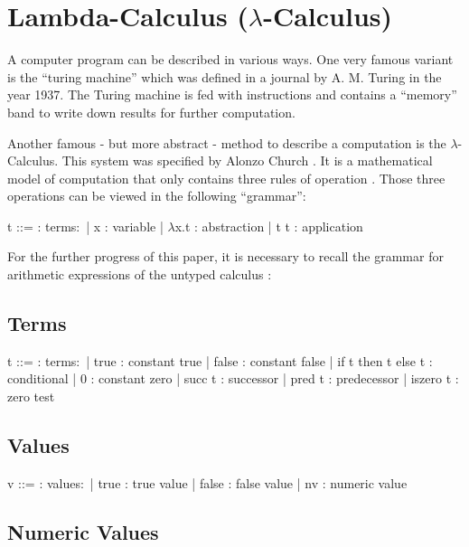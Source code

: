 \section{Lambda-Calculus ($\lambda$-Calculus)}
\label{sec:calculus}

A computer program can be described in various
ways. One very famous variant is the ``turing machine''
which was defined in a journal \cite{aturingMachine} by
A. M. Turing in the year 1937. The Turing machine
is fed with instructions and contains a ``memory'' band
to write down results for further computation.

Another famous - but more abstract - method to describe
a computation is the $\lambda$-Calculus. This system was
specified by Alonzo Church \cite{churchLambda}. It is a mathematical
model of computation that only contains three rules
of operation \cite{pierce2002ProgLang}.
Those three operations can be viewed in the following ``grammar'':

\begin{bnfgrammar}
    t ::= : terms$\colon$
    | x : variable
    | $\lambda$x.t : abstraction
    | t t : application
\end{bnfgrammar}

For the further progress of this paper, it is necessary to recall
the grammar for arithmetic expressions of the untyped calculus \cite{pierce2002ProgLang}:

\subsection{Terms}

\begin{bnfgrammar}
    t ::= : terms$\colon$
    | true : constant true
    | false : constant false
    | if t then t else t : conditional
    | 0 : constant zero
    | succ t : successor
    | pred t : predecessor
    | iszero t : zero test
\end{bnfgrammar}

\subsection{Values}

\begin{bnfgrammar}
    v ::= : values$\colon$
    | true : true value
    | false : false value
    | nv : numeric value
\end{bnfgrammar}

\subsection{Numeric Values}

